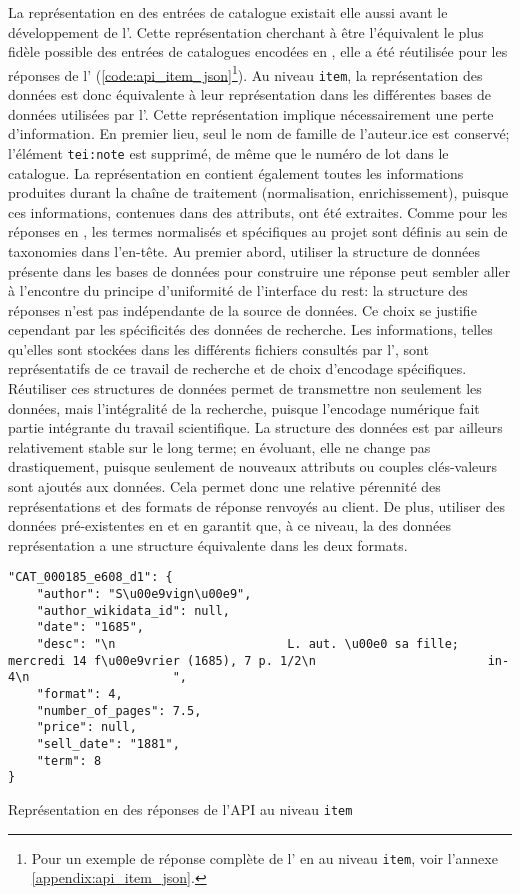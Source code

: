 La représentation en \json{} des entrées de catalogue existait elle aussi avant le développement de l'\api{}. Cette représentation cherchant à être l'équivalent le plus fidèle possible des entrées de catalogues encodées en \tei{}, elle a été réutilisée pour les réponses de l'\api{} (\ref{code:api_item_json}\footnote{
	Pour un exemple de réponse complète de l'\api{} en \xmltei{} au niveau \texttt{item}, voir l'annexe \ref{appendix:api_item_json}.
}). Au niveau \texttt{item}, la représentation des données est donc équivalente à leur représentation dans les différentes bases de données utilisées par l'\api{}. Cette représentation implique nécessairement une perte d'information. En premier lieu, seul le nom de famille de l'auteur.ice est conservé; l'élément \texttt{tei:note} est supprimé, de même que le numéro de lot dans le catalogue. La représentation en \json{} contient également toutes les informations produites durant la chaîne de traitement (normalisation, enrichissement), puisque ces informations, contenues dans des attributs, ont été extraites. Comme pour les réponses en \tei{}, les termes normalisés et spécifiques au projet sont définis au sein de taxonomies dans l'en-tête. Au premier abord, utiliser la structure de données présente dans les bases de données pour construire une réponse peut sembler aller à l'encontre du principe d'uniformité de l'interface du \gls{rest}: la structure des réponses n'est pas indépendante de la source de données. Ce choix se justifie cependant par les spécificités des données de recherche. Les informations, telles qu'elles sont stockées dans les différents fichiers consultés par l'\api{}, sont représentatifs de ce travail de recherche et de choix d'encodage spécifiques. Réutiliser ces structures de données permet de transmettre non seulement les données, mais l'intégralité de la recherche, puisque l'encodage numérique fait partie intégrante du travail scientifique. La structure des données est par ailleurs relativement stable sur le long terme; en évoluant, elle ne change pas drastiquement, puisque seulement de nouveaux attributs ou couples clés-valeurs sont ajoutés aux données. Cela permet donc une relative pérennité des représentations et des formats de réponse renvoyés au client. De plus, utiliser des données pré-existentes en \json{} et en \tei{} garantit que, à ce niveau, la des données représentation a une structure équivalente dans les deux formats.

\begin{listing}[h]
	\begin{verbatim}
"CAT_000185_e608_d1": {
	"author": "S\u00e9vign\u00e9",
	"author_wikidata_id": null,
	"date": "1685",
	"desc": "\n                        L. aut. \u00e0 sa fille; mercredi 14 f\u00e9vrier (1685), 7 p. 1/2\n                        in-4\n                    ",
	"format": 4,
	"number_of_pages": 7.5,
	"price": null,
	"sell_date": "1881",
	"term": 8
}

	\end{verbatim}
	\caption{Représentation en \json{} des réponses de l'API au niveau \texttt{item}}
	\label{code:api_item_json}
\end{listing}

